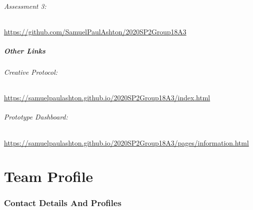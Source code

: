 \documentclass[11pt, oneside, a4paper, titlepage]{article}
\begin{document}
\paragraph{Assessment 3:}\hfill \break
\url{https://github.com/SamuelPaulAshton/2020SP2Group18A3}

\subsubsection{Other Links}
\paragraph{Creative Protocol:}\hfill \break
\url{https://samuelpaulashton.github.io/2020SP2Group18A3/index.html}
\paragraph{Prototype Dashboard:}\hfill \break
\url{https://samuelpaulashton.github.io/2020SP2Group18A3/pages/information.html}

\newpage


\part{Team Profile}

\section{Contact Details And Profiles}

\end{document}
